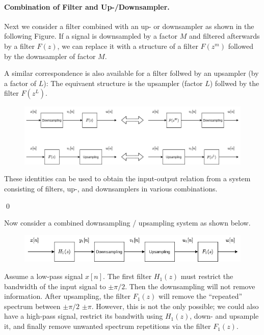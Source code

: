 \paragraph{Combination of Filter and Up-/Downsampler.} Next we consider a filter combined with an up- or downsampler as shown in the following Figure. If a signal is downsampled by a factor $M$ and filtered afterwards by a filter $F(z)$, we can replace it with a structure of a filter $F(z^m)$ followed by the downsampler of factor $M$.

A similar correspondence is also available for a filter follwed by an upsampler (by a factor of $L$): The equivaent structure is the upsampler (factor $L$) follwed by the filter $F(z^L)$. 


\begin{figure}[H]
    \centering
    \includegraphics[scale=0.45]{images/2021-11-09-subband_06a.png}
\end{figure}

These identities can be used to obtain the input-output relation from a system consisting of filters, up-, and downsamplers in various combinations.

\qed


Now consider a combined downsampling / upsampling system as shown below.


\begin{figure}[H]
    \centering
    \includegraphics[scale=0.5]{images/2021-11-09-subband_07.png}
\end{figure}


Assume a low-pass signal $x[n]$. The first filter $H_1(z)$ must restrict the bandwidth of the input signal to $\pm \pi/2$. Then the downsampling will not remove information. After upsampling, the filter $F_1(z)$ will remove the ``repeated'' spectrum between $\pm \pi/2$ $\pm \pi$. However, this is not the only possible; we could also have a high-pass signal, restrict its bandwith using $H_1(z)$, down- and upsample it, and finally remove unwanted spectrum repetitions via the filter $F_1(z)$.

